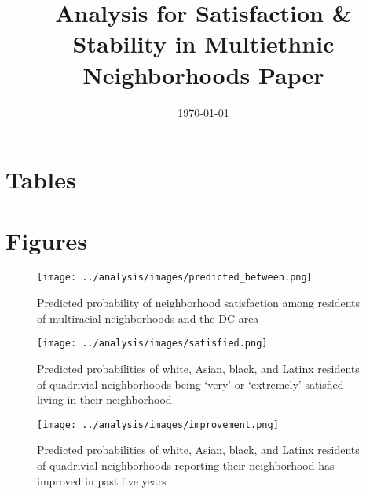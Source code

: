 \documentclass[]{baderart}
\title{Analysis for Satisfaction \& Stability in Multiethnic Neighborhoods Paper}
\date{\today}
\begin{document}
\maketitle

\section{Tables}











\clearpage
\section{Figures}

\begin{figure}[h!]
\begin{minipage}{\textwidth}
\centering
\caption{Predicted probability of neighborhood satisfaction among residents of multiracial neighborhoods and the DC area}
\texttt{[image: ../analysis/images/predicted\_between.png]}
\end{minipage}
\end{figure}

\begin{figure}[h!]
\centering
\caption{Predicted probabilities of white, Asian, black, and Latinx residents of quadrivial neighborhoods being `very' or `extremely' satisfied living in their neighborhood}
\texttt{[image: ../analysis/images/satisfied.png]}
\end{figure}

\begin{figure}[h!]
\centering
\caption{Predicted probabilities of white, Asian, black, and Latinx residents of quadrivial neighborhoods reporting their neighborhood has improved in past five years}
\texttt{[image: ../analysis/images/improvement.png]}
\end{figure}
\end{document}
